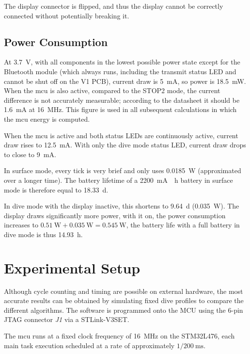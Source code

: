 The display connector is flipped, and thus the display cannot be correctly connected without potentially breaking it.

\subsection{Power Consumption}
At \SI{3.7}{\volt}, with all components in the lowest possible power state except for the Bluetooth module (which always runs, including the transmit status LED and cannot be shut off on the V1 PCB), current draw is \SI{5}{\milli\ampere}, so power is \SI{18.5}{\milli\watt}.
When the \gls{mcu} is also active, compared to the STOP2 mode, the current difference is not accurately measurable; according to the datasheet it should be \SI{1.6}{\milli\ampere} at \SI{16}{\mega\hertz}. 
This figure is used in all subsequent calculations in which the \gls{mcu} energy is computed.

When the \gls{mcu} is active and both status LEDs are continuously active, current draw rises to \SI{12.5}{\milli\ampere}.
With only the dive mode status LED, current draw drops to close to \SI{9}{\milli\ampere}.

In surface mode, every tick is very brief and only uses \SI{0.0185}{\watt} (approximated over a longer time). 
The battery lifetime of a \SI{2200}{\milli\ampere{}\hour} battery in surface mode is therefore equal to \SI{18.33}{\day}.

In dive mode with the display inactive, this shortens to \SI{9.64}{\day} (\SI{0.035}{\watt}). 
The display draws significantly more power, with it on, the power consumption increases to $\SI{0.51}{\watt} + \SI{0.035}{\watt} = \SI{0.545}{\watt}$, the battery life with a full battery in dive mode is thus \SI{14.93}{\hour}.

\section{Experimental Setup}
Although cycle counting and timing are possible on external hardware, the most accurate results can be obtained by simulating fixed dive profiles to compare the different algorithms.
The software is programmed onto the MCU using the 6-pin JTAG connector \emph{J1} via a STLink-V3SET.

The \gls{mcu} runs at a fixed clock frequency of \SI{16}{\mega\hertz} on the STM32L476, each main task execution scheduled at a rate of approximately $1 / \SI{200}{\milli\second}$.

